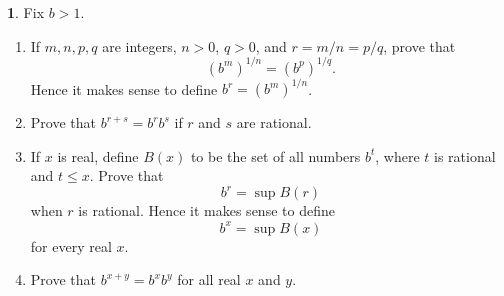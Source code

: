 \documentclass[12pt]{article}
\theoremstyle{definition}
\newtheorem{ex}{}
\begin{document}
\begin{ex}
	Fix $b > 1$.
	\begin{enumerate}[label=(\alph*)]
		\item If $m, n, p, q$ are integers, $n > 0$, $q > 0$, and $r = m/n = p/q$, prove that \begin{equation*}
			      (b^m)^{1/n} = (b^p)^{1/q}.
		      \end{equation*}
		      Hence it makes sense to define $b^r = (b^m)^{1/n}$.
		\item Prove that $b^{r + s} = b^rb^s$ if $r$ and $s$ are rational.
		\item If $x$ is real, define $B(x)$ to be the set of all numbers $b^t$, where $t$ is rational and $t \leq x$.
		      Prove that \begin{equation*}
			      b^r = \sup B(r)
		      \end{equation*}
		      when $r$ is rational.
		      Hence it makes sense to define \begin{equation*}
			      b^x = \sup B(x)
		      \end{equation*}
		      for every real $x$.
		\item Prove that $b^{x + y} = b^xb^y$ for all real $x$ and $y$.
	\end{enumerate}
\end{ex}
\end{document}
